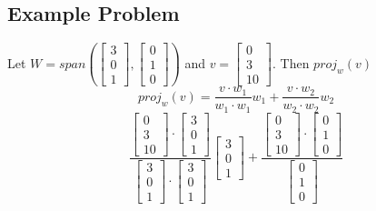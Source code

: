 \begin{enumerate}
\subsection{Example Problem}
Let $W = span(\begin{bmatrix} 3 \\ 0 \\ 1 \end{bmatrix}, 
\begin{bmatrix} 0 \\ 1 \\ 0 \end{bmatrix})$ and $v = \begin{bmatrix}
0 \\ 3 \\ 10 \end{bmatrix}$. Then $proj_w(v)$ 
\[
  proj_w(v) = \frac{v \cdot w_1}{w_1 \cdot w_1}w_1 + 
  \frac{v \cdot w_2}{w_2 \cdot w_2}w_2  
\]
\[
  \frac{\begin{bmatrix} 0 \\ 3 \\ 10 \end{bmatrix} \cdot 
    \begin{bmatrix} 3 \\ 0 \\ 1 \end{bmatrix}}{\begin{bmatrix} 3 \\ 0 \\ 1 
  \end{bmatrix} \cdot \begin{bmatrix} 3 \\ 0 \\ 1 \end{bmatrix}}
  \begin{bmatrix} 3 \\ 0 \\ 1 \end{bmatrix} + 
  \frac{\begin{bmatrix} 0 \\ 3 \\ 10 \end{bmatrix} \cdot \begin{bmatrix}
    0 \\ 1 \\ 0 \end{bmatrix}}{\begin{bmatrix} 0 \\ 1 \\ 0 \end{bmatrix}
}\]
\end{enumerate}
